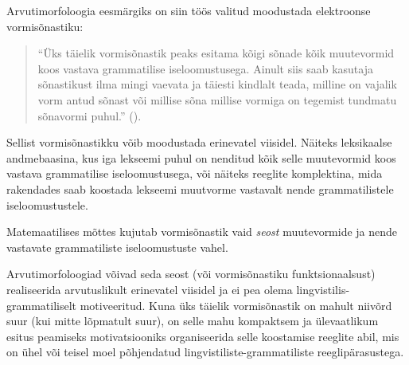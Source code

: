 \documentclass[12pt,a4paper]{article}
\begin{document}

Arvutimorfoloogia eesmärgiks on siin töös valitud moodustada elektroonse vormisõnastiku:
\begin{quote}
  ``Üks täielik vormisõnastik peaks esitama kõigi sõnade kõik muutevormid koos vastava grammatilise iseloomustusega. Ainult siis saab kasutaja sõnastikust ilma mingi vaevata ja täiesti kindlalt teada, milline on vajalik vorm antud sõnast või millise sõna millise vormiga on tegemist tundmatu sõnavormi puhul.'' (\cite[7]{viks_vaike_1992}).
\end{quote}


Sellist vormisõnastikku võib moodustada erinevatel viisidel. Näiteks leksikaalse andme\-baasina, kus iga lekseemi puhul on nenditud kõik selle muutevormid koos vastava grammatilise iseloomustusega, või näiteks reeglite komplektina, mida rakendades saab koostada lekseemi muutvorme vastavalt nende grammatilistele iseloomustustele.

Matemaatilises mõttes kujutab vormisõnastik vaid \textit{seost} muutevormide ja nende vastavate grammatiliste iseloomustuste vahel. 

Arvutimorfoloogiad võivad seda seost (või vormisõnastiku funktsionaalsust) realiseerida arvutuslikult erinevatel viisidel ja ei pea olema lingvistilis-grammatiliselt motiveeritud. Kuna üks täielik vormisõnastik on mahult niivõrd suur (kui mitte lõpmatult suur), on selle mahu kompaktsem ja ülevaatlikum esitus peamiseks motivatsiooniks organiseerida selle koostamise reeglite abil, mis on ühel või teisel moel põhjendatud lingvistiliste-grammatiliste reeglipärasustega.
\end{document}

